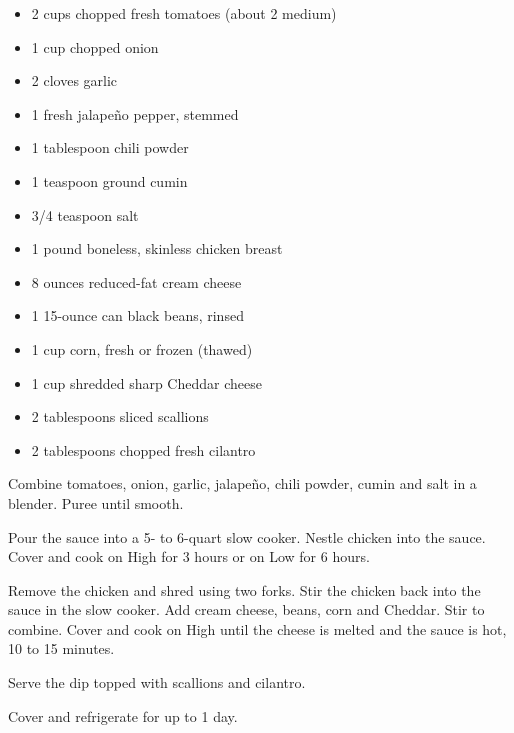 
\ingredients
\begin{itemize}
        \item 2 cups chopped fresh tomatoes (about 2 medium)
        \item 1 cup chopped onion
        \item 2 cloves garlic
        \item 1 fresh jalapeño pepper, stemmed
        \item 1 tablespoon chili powder
        \item 1 teaspoon ground cumin
        \item 3/4 teaspoon salt
        \item 1 pound boneless, skinless chicken breast
        \item 8 ounces reduced-fat cream cheese
        \item 1 15-ounce can black beans, rinsed
        \item 1 cup corn, fresh or frozen (thawed)
        \item 1 cup shredded sharp Cheddar cheese
        \item 2 tablespoons sliced scallions
        \item 2 tablespoons chopped fresh cilantro
\end{itemize}

\instructions
Combine tomatoes, onion, garlic, jalapeño, chili powder, cumin and salt
in a blender. Puree until smooth.

Pour the sauce into a 5- to 6-quart slow cooker. Nestle chicken into the
sauce. Cover and cook on High for 3 hours or on Low for 6 hours.

Remove the chicken and shred using two forks. Stir the chicken back into
the sauce in the slow cooker. Add cream cheese, beans, corn and Cheddar.
Stir to combine. Cover and cook on High until the cheese is melted and
the sauce is hot, 10 to 15 minutes.

Serve the dip topped with scallions and cilantro.

Cover and refrigerate for up to 1 day.
